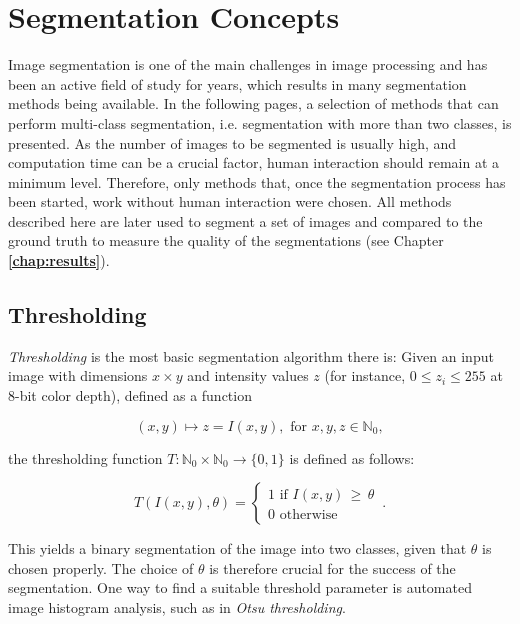 \chapter{Segmentation Concepts}
\label{chap:concepts}

Image segmentation is one of the main challenges in image processing and has been an active field of study for years, which results in many segmentation methods being available. In the following pages, a selection of methods that can perform multi-class segmentation, i.e. segmentation with more than two classes, is presented. As the number of images to be segmented is usually high, and computation time can be a crucial factor, human interaction should remain at a minimum level. Therefore, only methods that, once the segmentation process has been started, work without human interaction were chosen. All methods described here are later used to segment a set of images and compared to the ground truth to measure the quality of the segmentations (see Chapter \textbf{\ref{chap:results}}).
	
	\section{Thresholding}
\label{sec:thresholding}

\textit{Thresholding} \cite[pp. 82]{machine_vision} is the most basic segmentation algorithm there is: Given an input image with dimensions $x \times y$ and intensity values $z$ (for instance, $0 \leq z_i \leq 255$ at 8-bit color depth), defined as a function

\[(x, y) \mapsto z = I(x, y), \text{ for } x, y, z \in \mathbb{N}_0,\]

\noindent the thresholding function $T: \mathbb{N}_0 \times \mathbb{N}_0 \rightarrow \{0, 1\}$ is defined as follows:

\[ T(I(x, y), \theta) =  \begin{cases}
				1 \text{ if } I(x, y) \, \geq \, \theta \\
			           0 \text{ otherwise}
			     \end{cases}\,.
\]

\noindent This yields a binary segmentation of the image into two classes, given that $\theta$ is chosen properly. The choice of $\theta$ is therefore crucial for the success of the segmentation. One way to find a suitable threshold parameter is automated image histogram analysis, such as in \textit{Otsu thresholding}.\\

